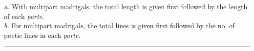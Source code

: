 \documentclass{article}
\begin{document}
\vspace{1em}

\raggedright
\noindent\textit{a.} With multipart madrigals, the total length is given first followed by the length of each \textit{parte}.\\
\noindent\textit{b.} For multipart madrigals, the total lines is given first followed by the no. of poetic lines in each \textit{parte}. 

\vspace{0.5em}
\noindent\rule{\textwidth}{0.4pt}
\end{document}
